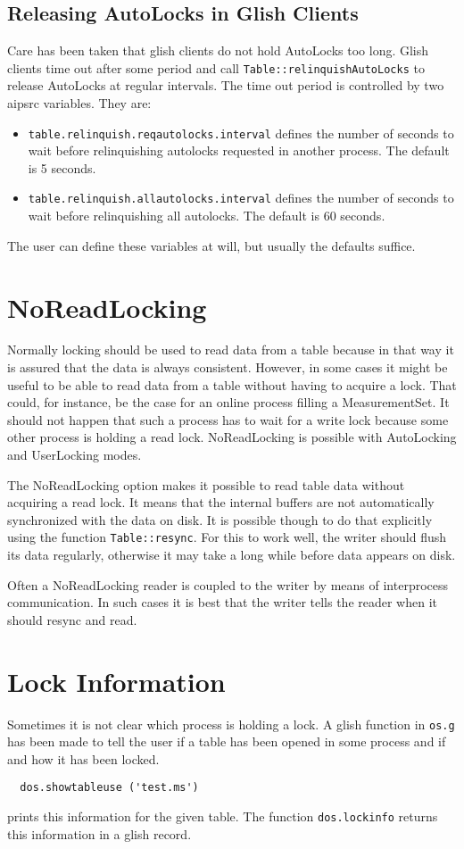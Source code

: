 \subsection{Releasing AutoLocks in Glish Clients}
Care has been taken that glish clients do not hold AutoLocks too long.
Glish clients time out after some period and call
\texttt{Table::relinquishAutoLocks} to release AutoLocks at regular
intervals. 
The time out period is controlled by two aipsrc variables. They are:
\begin{itemize}
\item \texttt{table.relinquish.reqautolocks.interval} defines the
number of seconds to wait before relinquishing autolocks requested in
another process. The default is 5 seconds.
\item \texttt{table.relinquish.allautolocks.interval} defines the
number of seconds to wait before relinquishing all autolocks. The
default is 60 seconds.
\end{itemize}
The user can define these variables at will, but usually the defaults
suffice. 

\section{\label{TABLELOCK:NOREADLOCKING}NoReadLocking}
Normally locking should be used to read data from a table because in
that way it is assured that the data is always consistent.
However, in some cases it might be useful to be able to read data from
a table without having to acquire a lock. That could, for instance, be the
case for an online process filling a MeasurementSet. It should not happen
that such a process has to wait for a write lock because some other
process is holding a read lock.
NoReadLocking is possible with AutoLocking and UserLocking modes.

The NoReadLocking option makes it possible to read table data without
acquiring a read lock. It means that the internal buffers are not
automatically synchronized with the data on disk. It is possible
though to do that explicitly using the function
\texttt{Table::resync}.
For this to work well, the writer should flush its data regularly,
otherwise it may take a long while before data appears on disk.

Often a NoReadLocking reader is coupled to the writer by means of
interprocess communication. In such cases it is best that the writer
tells the reader when it should resync and read.

\section{Lock Information}
Sometimes it is not clear which process is holding a lock.
A glish function in \texttt{os.g} has been made to tell the user
if a table has been opened in some process and if and how it has been locked.
\begin{verbatim}
  dos.showtableuse ('test.ms')
\end{verbatim}
prints this information for the given table. The function
\texttt{dos.lockinfo} returns this information in a glish record.

